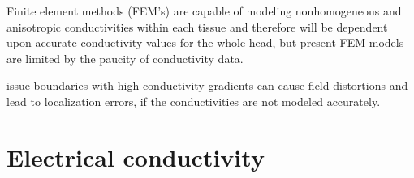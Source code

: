

Finite element methods (FEM's) are capable of modeling nonhomogeneous and anisotropic conductivities within each tissue and therefore will be dependent upon accurate conductivity values for the whole head, but present FEM models are limited by the paucity of conductivity data.

issue boundaries with high conductivity gradients can cause field distortions and lead to localization errors, if the conductivities are not modeled accurately.


\section{Electrical conductivity}

